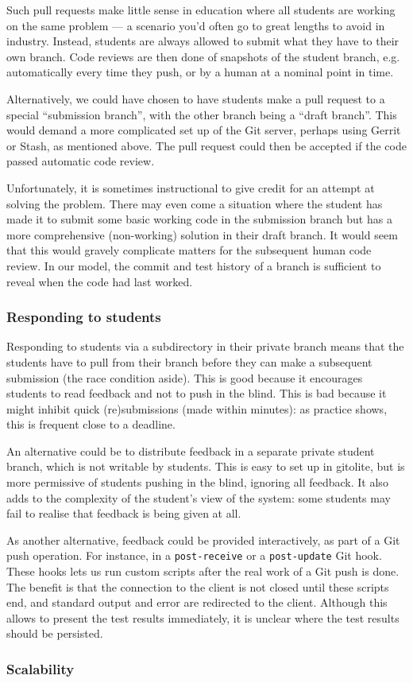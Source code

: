 Such pull requests make little sense in education where all students are
working on the same problem --- a scenario you'd often go to great lengths to
avoid in industry. Instead, students are always allowed to submit what they
have to their own branch. Code reviews are then done of snapshots of the
student branch, e.g. automatically every time they push, or by a human at a
nominal point in time.

Alternatively, we could have chosen to have students make a pull request to a
special ``submission branch'', with the other branch being a ``draft branch''.
This would demand a more complicated set up of the Git server, perhaps using
Gerrit or Stash, as mentioned above. The pull request could then be accepted
if the code passed automatic code review.

Unfortunately, it is sometimes instructional to give credit for an attempt at
solving the problem. There may even come a situation where the student has made
it to submit some basic working code in the submission branch but has a more
comprehensive (non-working) solution in their draft branch. It would seem that
this would gravely complicate matters for the subsequent human code review. In
our model, the commit and test history of a branch is sufficient to reveal when
the code had last worked.

\subsubsection{Responding to students}

Responding to students via a subdirectory in their private branch means that
the students have to pull from their branch before they can make a subsequent
submission (the race condition aside). This is good because it encourages
students to read feedback and not to push in the blind. This is bad because it
might inhibit quick (re)submissions (made within minutes): as practice shows,
this is frequent close to a deadline.

An alternative could be to distribute feedback in a separate private student
branch, which is not writable by students. This is easy to set up in gitolite,
but is more permissive of students pushing in the blind, ignoring all feedback.
It also adds to the complexity of the student's view of the system: some
students may fail to realise that feedback is being given at all.

As another alternative, feedback could be provided interactively, as part of a
Git push operation. For instance, in a \texttt{post-receive} or a
\texttt{post-update} Git hook. These hooks lets us run custom scripts after the
real work of a Git push is done. The benefit is that the connection to the
client is not closed until these scripts end, and standard output and error are
redirected to the client\cite{man-5-githooks}. Although this allows to present
the test results immediately, it is unclear where the test results should be
persisted.

\subsubsection{Scalability}

